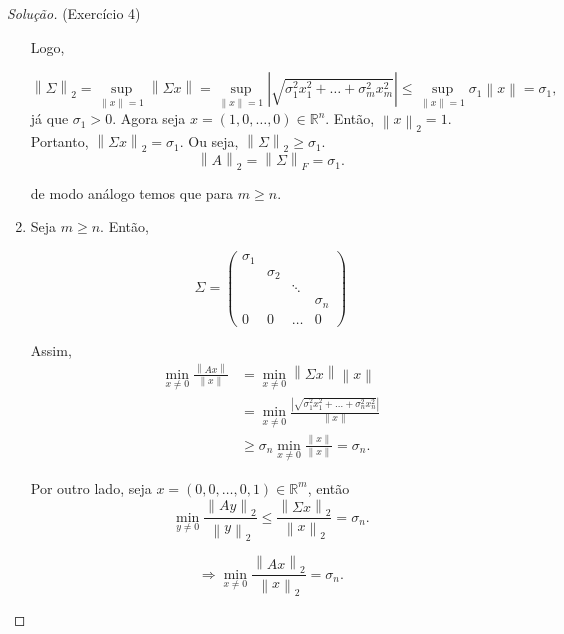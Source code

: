 \documentclass[a4paper,10pt]{article}
\newenvironment{solution}
  {\begin{proof}[Solução]}
  {\end{proof}}
\newcommand{\norm}[1]{\left\lVert#1\right\rVert}
\begin{document}
\begin{solution}{(Exercício 4)}
\begin{enumerate}
      Logo,

      \begin{equation*}
        \norm{\Sigma}_2 = \sup_{\norm{x} = 1} \norm{\Sigma x} = \sup_{\norm{x} = 1}
        \left|\sqrt{\sigma_1^2x_1^2 + \dots + \sigma_m^2x_m^2}\right| \leq \sup_{\norm{x} = 1} \sigma_1 \norm{x} = \sigma_1,
      \end{equation*}
      já que $\sigma_1 > 0$.
      Agora seja $x = (1, 0, \dots, 0)\in \mathbb{R}^n$. Então, $\norm{x}_2 = 1$.
      Portanto, $\norm{\Sigma x}_2 = \sigma_1$. Ou seja, $\norm{\Sigma}_2 \geq \sigma_1$.
      \begin{equation*}
        \norm{A}_2 = \norm{\Sigma}_F = \sigma_1.
      \end{equation*}

      de modo análogo temos que para $m \geq n$.

      \item Seja $m\geq n$. Então,

      \begin{equation*}
        \Sigma = \begin{pmatrix}
          \sigma_1 & & &\\
          &\sigma_2 & & \\
          & & \ddots &  \\
          & & &\sigma_n \\
          0 & 0 & \dots & 0
        \end{pmatrix}
      \end{equation*}

      Assim,
      \begin{equation*}
        \begin{split}
          \min_{x\neq 0} \frac{\norm{Ax}}{\norm{x}} &= \min_{x\neq 0}{\norm{\Sigma x}}{\norm{x}} \\
          &= \min_{x\neq 0} \frac{\left|\sqrt{\sigma_1^2x_1^2 + \dots + \sigma_n^2x_n^2}\right|}{\norm{x}} \\
          &\geq \sigma_n \min_{x\neq 0} \frac{\norm{x}}{\norm{x}} = \sigma_n.
        \end{split}
      \end{equation*}

      Por outro lado, seja $x = (0, 0, \dots, 0, 1) \in \mathbb{R}^m$, então
      \begin{equation*}
        \min_{y\neq 0} \frac{\norm{Ay}_2}{\norm{y}_2} \leq \frac{\norm{\Sigma x}_2}{\norm{x}_2} = \sigma_n.
      \end{equation*}

      \begin{equation*}
        \Rightarrow \min_{x\neq 0} \frac{\norm{Ax}_2}{\norm{x}_2} = \sigma_n.
      \end{equation*}
    \end{enumerate}
  \end{solution}
\end{document}
